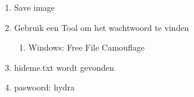 \begin{enumerate}
  \item Save image
  \item Gebruik een Tool om het wachtwoord te vinden
  \begin{enumerate}
  \item Windows: Free File Camouflage
  \end{enumerate}
  \item hideme.txt wordt gevonden
  \item paswoord: hydra
\end{enumerate}